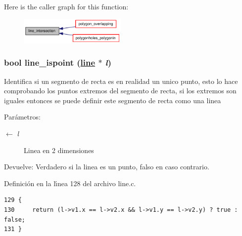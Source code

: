 Here is the caller graph for this function:\begin{figure}[H]
\begin{center}
\leavevmode
\includegraphics[width=147pt]{group__geometry_g95f804c79e71c1ca62453b6f0123e307_g95f804c79e71c1ca62453b6f0123e307_icgraph}
\end{center}
\end{figure}
\hypertarget{group__geometry_g68d4dad9b8e742b0d63affc853f80391_g68d4dad9b8e742b0d63affc853f80391}{
\subsubsection[line\_\-ispoint]{\setlength{\rightskip}{0pt plus 5cm}bool line\_\-ispoint (\hyperlink{struct__line}{line} $\ast$ {\em l})}}
\label{group__geometry_g68d4dad9b8e742b0d63affc853f80391_g68d4dad9b8e742b0d63affc853f80391}


Identifica si un segmento de recta es en realidad un unico punto, esto lo hace comprobando los puntos extremos del segmento de recta, si los extremos son iguales entonces se puede definir este segmento de recta como una linea

\begin{Desc}
\item[Par\'{a}metros:]
\begin{description}
\item[\mbox{$\leftarrow$} {\em l}]Linea en 2 dimensiones \end{description}
\end{Desc}
\begin{Desc}
\item[Devuelve:]Verdadero si la linea es un punto, falso en caso contrario. \end{Desc}


Definici\'{o}n en la l\'{\i}nea 128 del archivo line.c.

\begin{Code}\begin{verbatim}129 {
130     return (l->v1.x == l->v2.x && l->v1.y == l->v2.y) ? true : false;
131 }
\end{verbatim}\end{Code}




